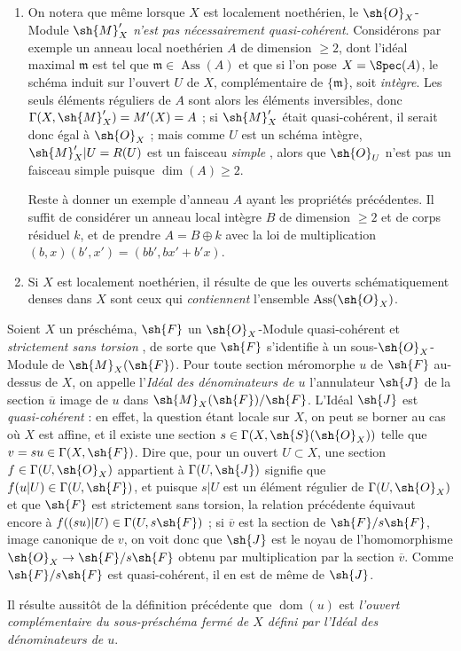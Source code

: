 \begin{remarks}[20.2.13]
\begin{enumerate}[label=(\roman*)]
  \item On notera que même lorsque $X$ est localement noethérien, le $\sh{O}_X$-Module $\sh{M}'_X$ \emph{n'est pas nécessairement quasi-cohérent}.
  Considérons par exemple un anneau local noethérien $A$ de dimension $\geq2$, dont l'idéal maximal $\mathfrak{m}$ est tel que $\mathfrak{m}\in\operatorname{Ass}(A)$ et que si l'on pose $X=\Spec(A)$, le schéma induit sur l'ouvert $U$ de $X$, complémentaire de $\{\mathfrak{m}\}$, soit \emph{intègre}.
  Les seuls éléments réguliers de $A$ sont alors les éléments inversibles, donc $\Gamma(X,\sh{M}'_X)=M'(X)=A$ ; si $\sh{M}'_X$ était quasi-cohérent, il serait donc égal à $\sh{O}_X$ ; mais comme $U$ est un schéma intègre, $\sh{M}'_X|U=R(U)$ est un faisceau \emph{simple} , alors que $\sh{O}_U$ n'est pas un faisceau simple puisque $\dim(A)\geq2$.

  Reste à donner un exemple d'anneau $A$ ayant les propriétés précédentes.
  Il suffit de considérer un anneau local intègre $B$ de dimension $\geq2$ et de corps résiduel $k$, et de prendre $A=B\oplus k$ avec la loi de multiplication $(b,x)(b',x')=(bb',bx'+b'x)$.

  \item Si $X$ est localement noethérien, il résulte de  que les ouverts schématiquement denses dans $X$ sont ceux qui \emph{contiennent} l'ensemble $\operatorname{Ass}(\sh{O}_X)$.
\end{enumerate}
\end{remarks}

\begin{env}[20.2.14]
\label{IV.20.2.14}
Soient $X$ un préschéma, $\sh{F}$ un $\sh{O}_X$-Module quasi-cohérent et \emph{strictement sans torsion} , de sorte que $\sh{F}$ s'identifie à un sous-$\sh{O}_X$-Module de $\sh{M}_X(\sh{F})$.
Pour toute section méromorphe $u$ de $\sh{F}$ au-dessus de $X$, on appelle l'\emph{Idéal des dénominateurs de $u$} l'annulateur $\sh{J}$ de la section $\overline{u}$ image de $u$ dans $\sh{M}_X(\sh{F})/\sh{F}$.
L'Idéal $\sh{J}$ est \emph{quasi-cohérent} : en effet, la question étant locale sur $X$, on peut se borner au cas où $X$ est affine, et il existe une section $s\in\Gamma(X,\sh{S}(\sh{O}_X))$ telle que $v=su\in\Gamma(X,\sh{F})$.
Dire que, pour un ouvert $U\subset X$, une section $f\in\Gamma(U,\sh{O}_X)$ appartient à $\Gamma(U,\sh{J})$ signifie que $f(u|U)\in\Gamma(U,\sh{F})$, et puisque $s|U$ est un élément régulier de $\Gamma(U,\sh{O}_X)$ et que $\sh{F}$ est strictement sans torsion, la relation précédente équivaut encore à $f((su)|U)\in\Gamma(U,s\sh{F})$ ; si $\overline{v}$ est la section de $\sh{F}/s\sh{F}$, image canonique de $v$, on voit donc que $\sh{J}$ est le noyau de l'homomorphisme $\sh{O}_X\to\sh{F}/s\sh{F}$ obtenu par multiplication par la section $\overline{v}$.
Comme $\sh{F}/s\sh{F}$ est quasi-cohérent, il en est de même de $\sh{J}$.

Il résulte aussitôt de la définition précédente que $\operatorname{dom}(u)$ est \emph{l'ouvert complémentaire du sous-préschéma fermé de $X$ défini par l'Idéal des dénominateurs de $u$}.
\end{env}


